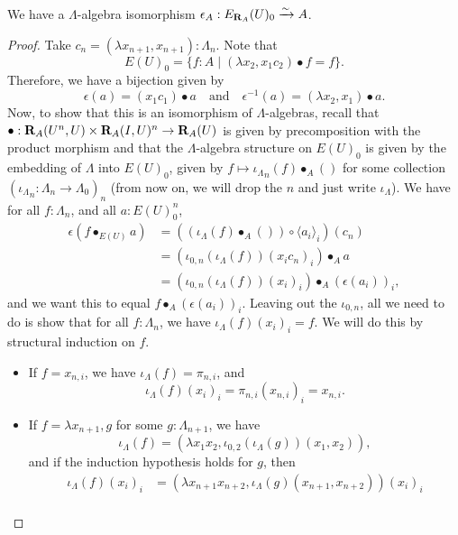 \begin{lemma}\label{lem:elementary-essentially-surjective}
  We have a $ \Lambda $-algebra isomorphism $ \epsilon_A : E_{\mathbf{R}_A}(U)_0 \xrightarrow \sim A $.
\end{lemma}
\begin{proof}
  Take $ c_n = (\lambda x_{n + 1}, x_{n + 1}): \Lambda_n $. Note that
  \[ E(U)_0 = \{ f : A \mid (\lambda x_2, x_1 c_2) \bullet f = f \}. \]
  Therefore, we have a bijection given by
  \[ \epsilon(a) = (x_1 c_1) \bullet a \quad \text{and} \quad \epsilon^{-1}(a) = (\lambda x_2, x_1) \bullet a. \]
  Now, to show that this is an isomorphism of $ \Lambda $-algebras, recall that $ \bullet: \mathbf{R}_A(U^n, U) \times \mathbf{R}_A(I, U)^n \to \mathbf{R}_A(U) $ is given by precomposition with the product morphism and that the $ \Lambda $-algebra structure on $ E(U)_0 $ is given by the embedding of $ \Lambda $ into $ E(U)_0 $, given by $ f \mapsto {\iota_\Lambda}_n(f) \bullet_A () $ for some collection $ ({\iota_\Lambda}_n: \Lambda_n \to \Lambda_0)_n $ (from now on, we will drop the $ n $ and just write $ \iota_\Lambda $). We have for all $ f: \Lambda_n $, and all $ a : E(U)_0^n $,
  \begin{align*}
    \epsilon(f \bullet_{E(U)} a)
    &= ((\iota_\Lambda(f) \bullet_A ()) \circ \langle a_i \rangle_i)(c_n)\\
    &= (\iota_{0, n}(\iota_\Lambda(f)) (x_i c_n)_i) \bullet_A a\\
    &= (\iota_{0, n}(\iota_\Lambda(f)) (x_i)_i) \bullet_A (\epsilon(a_i))_i,
  \end{align*}
  and we want this to equal $ f \bullet_A (\epsilon(a_i))_i $. Leaving out the $ \iota_{0, n} $, all we need to do is show that for all $ f: \Lambda_n $, we have $ \iota_\Lambda(f) (x_i)_i = f $. We will do this by structural induction on $ f $.
  \begin{itemize}
    \item If $ f = x_{n, i} $, we have $ \iota_\Lambda(f) = \pi_{n, i} $, and
      \[ \iota_\Lambda(f) (x_i)_i = \pi_{n, i} (x_{n, i})_i = x_{n, i}. \]
    \item If $ f = \lambda x_{n + 1}, g $ for some $ g: \Lambda_{n + 1} $, we have
      \[ \iota_\Lambda(f) = (\lambda x_1 x_2, \iota_{0, 2}(\iota_\Lambda(g)) (x_1, x_2)), \]
      and if the induction hypothesis holds for $ g $, then
      \begin{align*}
        \iota_\Lambda(f) (x_i)_i
        &= (\lambda x_{n + 1} x_{n + 2}, \iota_\Lambda(g) (x_{n + 1}, x_{n + 2})) (x_i)_i\\

\end{align*}
\end{itemize}
\end{proof}
